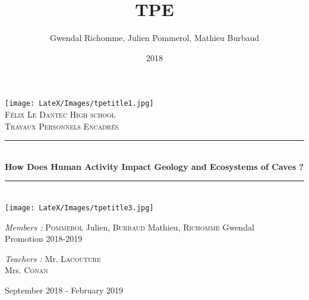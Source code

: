 \documentclass[draft, final]{report}
\title{TPE}
\date{2018}
\author{Gwendal Richomme, Julien Pommerol, Mathieu Burbaud}
\newcommand{\HRule}{\rule{\linewidth}{0.5mm}}
\begin{document}

\begin{titlepage}
  \begin{sffamily}
  \begin{center}

    \texttt{[image: LateX/Images/tpetitle1.jpg]}~\\[1.1cm]

    \textsc{\LARGE Félix Le Dantec High school}\\[1.0cm]

    \textsc{\Large Travaux Personnels Encadrés}\\[1.0cm]

    \HRule \\[0.4cm]
    { \huge \bfseries How Does Human Activity Impact Geology and Ecosystems of Caves ?\\[0.4cm] }

    \HRule \\[1.1cm]
    \texttt{[image: LateX/Images/tpetitle3.jpg]}
    \\[1.3cm]

    \begin{minipage}{0.4\textwidth}
      \begin{flushleft} \large
        \emph{Members :} \textsc{Pommerol} Julien, \textsc{Burbaud} Mathieu, \textsc{Richomme} Gwendal\\
        \smallbreak
        Promotion 2018-2019\\
      \end{flushleft}
    \end{minipage}
    \begin{minipage}{0.4\textwidth}
      \begin{flushright} \large
        \emph{Teachers :}  Mr. \textsc{Lacouture}\\
                            Mrs. \textsc{Conan}\\
      \end{flushright}
    \end{minipage}

    \vfill

    {\large September 2018 - February 2019}

  \end{center}
  \end{sffamily}
\end{titlepage}
\end{document}
